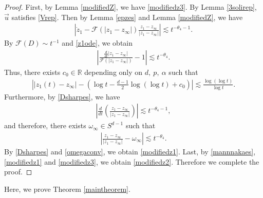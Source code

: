 \documentclass[reqno]{amsart}
\theoremstyle{plain}
\theoremstyle{definition}
\numberwithin{equation}{section}
\newcommand{\1}{\mathbbm{1}}
\begin{document}
\begin{proof}
First, by Lemma \ref{modifiedZ}, we have \eqref{modifiedz3}. By Lemma \ref{3solirep}, $\vec{u}$ satisfies \eqref{Vrep}. Then by Lemma \ref{epzes} and Lemma \ref{modifiedZ}, we have
\begin{align}\label{z1ode}
\left|\dot{z}_1-\mathcal{F}(|z_1-z_{\infty}|)\frac{z_1-z_{\infty}}{|z_1-z_{\infty}|}\right|\lesssim t^{-\theta_4-1}.
\end{align}
By $\mathcal{F}(D)\sim t^{-1}$ and \eqref{z1ode}, we obtain
\begin{align*}
\left|\frac{\frac{d}{dt}|z_1-z_\infty|}{\mathcal{F}(|z_1-z_{\infty}|)}-1\right|\lesssim t^{-\theta_4}.
\end{align*}
Thus, there exists $c_0\in \mathbb{R}$ depending only on $d,\ p,\ \alpha$ such that
\begin{align}\label{Dsharpes}
\left||z_1(t)-z_{\infty}|-\left(\log{t}-\frac{d-1}{2}\log{(\log{t})}+c_0\right)\right|\lesssim \frac{\log{(\log{t})}}{\log{t}}.
\end{align}
Furthermore, by \eqref{Dsharpes}, we have
\begin{align*}
\left|\frac{d}{dt} \left(\frac{z_1-z_{\infty}}{|z_1-z_{\infty}|}\right)\right|\lesssim t^{-\theta_4-1},
\end{align*}
and therefore, there exists $\omega_{\infty}\in S^{d-1}$ such that 
\begin{align}\label{omegaconv}
\left| \frac{z_1-z_{\infty}}{|z_1-z_{\infty}|}-\omega_{\infty}\right|\lesssim t^{-\theta_4}.
\end{align}
By \eqref{Dsharpes} and \eqref{omegaconv}, we obtain \eqref{modifiedz1}. Last, by \eqref{mannnakaes}, \eqref{modifiedz1} and \eqref{modifiedz3}, we obtain \eqref{modifiedz2}. Therefore we complete the proof.
\end{proof}
Here, we prove Theorem \ref{maintheorem}.
\end{document}
